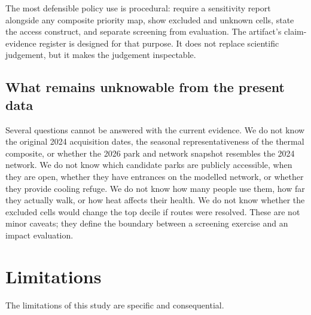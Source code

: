 \documentclass[times,twoside]{_Templates/MultiTargetManuscript}
\begin{document}
The most defensible policy use is procedural: require a sensitivity report
alongside any composite priority map, show excluded and unknown cells, state the
access construct, and separate screening from evaluation. The artifact's
claim-evidence register is designed for that purpose. It does not replace
scientific judgement, but it makes the judgement inspectable.

\subsection{What remains unknowable from the present data}

Several questions cannot be answered with the current evidence. We do not know
the original 2024 acquisition dates, the seasonal representativeness of the
thermal composite, or whether the 2026 park and network snapshot resembles the
2024 network. We do not know which candidate parks are publicly accessible, when
they are open, whether they have entrances on the modelled network, or whether
they provide cooling refuge. We do not know how many people use them, how far
they actually walk, or how heat affects their health. We do not know whether the
excluded cells would change the top decile if routes were resolved. These are
not minor caveats; they define the boundary between a screening exercise and an
impact evaluation.

\section{Limitations}

The limitations of this study are specific and consequential.
\end{document}
